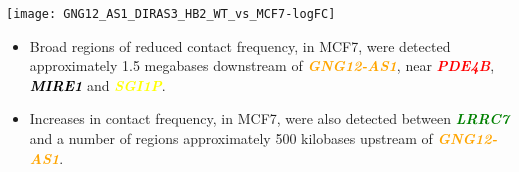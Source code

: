 \documentclass[a0paper, portrait]{baposter}
\begin{document}
\begin{poster}
{\begin{center}
\texttt{[image: GNG12\_AS1\_DIRAS3\_HB2\_WT\_vs\_MCF7-logFC]}
\end{center}

\begin{itemize}[leftmargin=*]
\item Broad regions of reduced contact frequency, in MCF7, were detected approximately 1.5 megabases downstream of \textcolor{orange}{\textit{\textbf{GNG12-AS1}}}, near \textcolor{red}{\textit{\textbf{PDE4B}}}, \textcolor{black}{\textit{\textbf{MIRE1}}} and \textcolor{yellow}{\textit{\textbf{SGI1P}}}.
\item Increases in contact frequency, in MCF7, were also detected between \textcolor{green}{\textit{\textbf{LRRC7}}} and a number of regions approximately 500 kilobases upstream of \textcolor{orange}{\textit{\textbf{GNG12-AS1}}}.
\end{itemize}
}

\end{poster}
\end{document}
